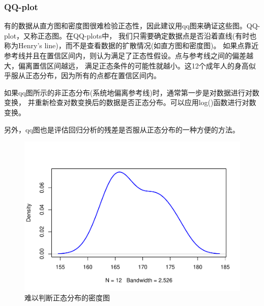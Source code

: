 \documentclass[
]{article}
\newenvironment{Shaded}{\begin{snugshade}}{\end{snugshade}}
\newcommand{\CommentTok}[1]{\textcolor[rgb]{0.56,0.35,0.01}{\textit{#1}}}
\newcommand{\DataTypeTok}[1]{\textcolor[rgb]{0.13,0.29,0.53}{#1}}
\newcommand{\DecValTok}[1]{\textcolor[rgb]{0.00,0.00,0.81}{#1}}
\newcommand{\KeywordTok}[1]{\textcolor[rgb]{0.13,0.29,0.53}{\textbf{#1}}}
\newcommand{\NormalTok}[1]{#1}
\newcommand{\OperatorTok}[1]{\textcolor[rgb]{0.81,0.36,0.00}{\textbf{#1}}}
\newcommand{\StringTok}[1]{\textcolor[rgb]{0.31,0.60,0.02}{#1}}
\begin{document}
\hypertarget{qq-plot}{%
\subsubsection{QQ-plot}\label{qq-plot}}

有的数据从直方图和密度图很难检验正态性，因此建议用qq图来确证这些图。QQ-plot，又称正态图。在QQ-plots中，
我们只需要确定数据点是否沿着直线(有时也称为Henry's line)，而不是查看数据的扩散情况(如直方图和密度图)。
如果点靠近参考线并且在置信区间内，则认为满足了正态性假设。点与参考线之间的偏差越大，偏离置信区间越远，
满足正态条件的可能性就越小。这12个成年人的身高似乎服从正态分布，因为所有的点都在置信区间内。

如果qq图所示的非正态分布(系统地偏离参考线)时，通常第一步是对数据进行对数变换，
并重新检查对数变换后的数据是否正态分布。可以应用log()函数进行对数变换。

另外，qq图也是评估回归分析的残差是否服从正态分布的一种方便的方法。

\begin{figure}

{\centering \includegraphics[width=0.49\linewidth,height=0.49\textheight]{figs/qqPlottest1} 

}

\caption{难以判断正态分布的密度图}\label{fig:qqPlottest1}
\end{figure}

\begin{Shaded}
\end{Shaded}
\end{document}
